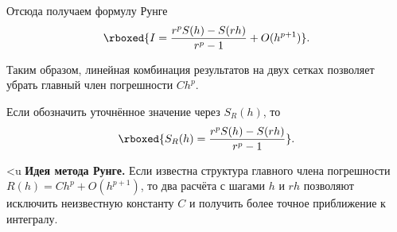 \documentclass[../final.tex]{subfiles}
\begin{document}
Отсюда получаем формулу Рунге
%
\begin{equation*}
    \rboxed{
    I
    =
    \frac{r^pS(h)-S(rh)}{r^p-1}
    +O(h^{p+1})
    }.
\end{equation*}

Таким образом, линейная комбинация результатов на двух сетках позволяет
убрать главный член погрешности $Ch^p$.

Если обозначить уточнённое значение через $S_R(h)$, то
%
\begin{equation*}
    \rboxed{
    S_R(h)
    =
    \frac{r^pS(h)-S(rh)}{r^p-1}
    }.
\end{equation*}

\begin{rbox}[left=18pt,right=18pt,top=13pt,bottom=13pt]{<u}
    \textbf{Идея метода Рунге.}
    Если известна структура главного члена погрешности
    $R(h)=Ch^p+O(h^{p+1})$, то два расчёта с шагами $h$ и $rh$
    позволяют исключить неизвестную константу $C$ и получить более
    точное приближение к интегралу.
\end{rbox}
\end{document}
